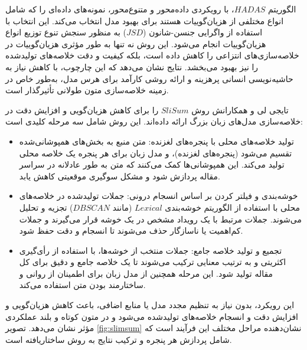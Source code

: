 الگوریتم $HADAS$، با رویکردی داده‌محور و متنوع‌محور، نمونه‌های داده‌ای را که شامل انواع مختلفی از هزیان‌گوییات هستند برای بهبود مدل انتخاب می‌کند. این انتخاب با استفاده از واگرایی جنسن-شانون ($JSD$) به منظور سنجش تنوع توزیع انواع هزیان‌گوییات انجام می‌شود. این روش نه تنها به طور مؤثری هزیان‌گوییات در خلاصه‌سازی‌های انتزاعی را کاهش داده است، بلکه کیفیت و دقت خلاصه‌های تولیدشده را نیز بهبود می‌بخشد. نتایج نشان می‌دهد که این چارچوب، با کاهش نیاز به حاشیه‌نویسی انسانی پرهزینه و ارائه روشی کارآمد برای هرس مدل، به‌طور خاص در زمینه خلاصه‌سازی متون طولانی تأثیرگذار است\cite{xia2024hallucinationdiversityawareactivelearning}.


 تایجی لی و همکارانش روش $SliSum$ را برای کاهش هزیان‌گویی و افزایش دقت در خلاصه‌سازی مدل‌های زبان بزرگ ارائه داده‌اند. این روش شامل سه مرحله کلیدی است:
\begin{itemize}
	\item 
تولید خلاصه‌های محلی با پنجره‌های لغزنده: متن منبع به بخش‌های همپوشانی‌شده تقسیم می‌شود (پنجره‌های لغزنده)، و مدل زبان برای هر پنجره یک خلاصه محلی تولید می‌کند. این همپوشانی‌ها کمک می‌کنند که متن به طور عادلانه در سراسر مقاله پردازش شود و مشکل سوگیری موقعیتی کاهش یابد.
\item 
خوشه‌بندی و فیلتر کردن بر اساس انسجام درونی: جملات تولیدشده در خلاصه‌های محلی با استفاده از الگوریتم خوشه‌بندی $Lexical$ (مانند $DBSCAN$) تجزیه و تحلیل می‌شوند. جملات مرتبط با یک رویداد مشخص در یک خوشه قرار می‌گیرند و جملات کم‌اهمیت یا ناسازگار حذف می‌شوند تا انسجام و دقت حفظ شود.
\item 
تجمیع و تولید خلاصه جامع: جملات منتخب از خوشه‌ها، با استفاده از رأی‌گیری اکثریتی و به ترتیب معنایی ترکیب می‌شوند تا یک خلاصه جامع و دقیق برای کل مقاله تولید شود. این مرحله همچنین از مدل زبان برای اطمینان از روانی و ساختارمند بودن متن استفاده می‌کند.
\end{itemize}
این رویکرد، بدون نیاز به تنظیم مجدد مدل یا منابع اضافی، باعث کاهش هزیان‌گویی و افزایش دقت و انسجام خلاصه‌های تولیدشده می‌شود و در متون کوتاه و بلند عملکردی مؤثر نشان می‌دهد. تصویر \ref{fig:slimsum} نشان‌دهنده مراحل مختلف این فرآیند است که شامل پردازش هر پنجره و ترکیب نتایج به روش ساختاریافته است\cite{li-etal-2024-improving-faithfulness}.


